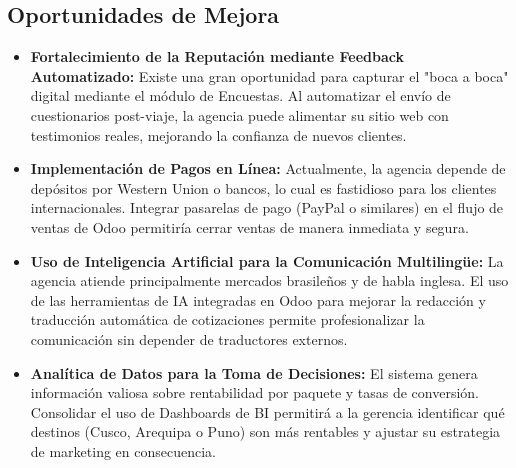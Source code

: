 \subsection{Oportunidades de Mejora}

\begin{itemize}
    \item \textbf{Fortalecimiento de la Reputación mediante Feedback Automatizado:} Existe una gran oportunidad para capturar el "boca a boca" digital mediante el módulo de Encuestas. Al automatizar el envío de cuestionarios post-viaje, la agencia puede alimentar su sitio web con testimonios reales, mejorando la confianza de nuevos clientes.
    \item \textbf{Implementación de Pagos en Línea:} Actualmente, la agencia depende de depósitos por Western Union o bancos, lo cual es fastidioso para los clientes internacionales. Integrar pasarelas de pago (PayPal o similares) en el flujo de ventas de Odoo permitiría cerrar ventas de manera inmediata y segura.
    \item \textbf{Uso de Inteligencia Artificial para la Comunicación Multilingüe:} La agencia atiende principalmente mercados brasileños y de habla inglesa. El uso de las herramientas de IA integradas en Odoo para mejorar la redacción y traducción automática de cotizaciones permite profesionalizar la comunicación sin depender de traductores externos.
    \item \textbf{Analítica de Datos para la Toma de Decisiones:} El sistema genera información valiosa sobre rentabilidad por paquete y tasas de conversión. Consolidar el uso de Dashboards de BI permitirá a la gerencia identificar qué destinos (Cusco, Arequipa o Puno) son más rentables y ajustar su estrategia de marketing en consecuencia.
\end{itemize}
